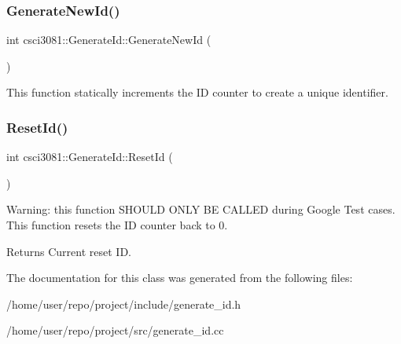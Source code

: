 \subsubsection{\texorpdfstring{Generate\+New\+Id()}{GenerateNewId()}}
{\footnotesize\ttfamily int csci3081\+::\+Generate\+Id\+::\+Generate\+New\+Id (\begin{DoxyParamCaption}{ }\end{DoxyParamCaption})\hspace{0.3cm}{\ttfamily [static]}}

This function statically increments the ID counter to create a unique identifier. \mbox{\label{classcsci3081_1_1GenerateId_afb9af0fc5150212ef877a786fa597c9b}} 
\subsubsection{\texorpdfstring{Reset\+Id()}{ResetId()}}
{\footnotesize\ttfamily int csci3081\+::\+Generate\+Id\+::\+Reset\+Id (\begin{DoxyParamCaption}{ }\end{DoxyParamCaption})}

Warning\+: this function S\+H\+O\+U\+LD O\+N\+LY BE C\+A\+L\+L\+ED during Google Test cases. This function resets the ID counter back to 0. \begin{DoxyReturn}{Returns}
Current reset ID. 
\end{DoxyReturn}


The documentation for this class was generated from the following files\+:\begin{DoxyCompactItemize}
\item 
/home/user/repo/project/include/generate\+\_\+id.\+h\item 
/home/user/repo/project/src/generate\+\_\+id.\+cc\end{DoxyCompactItemize}
